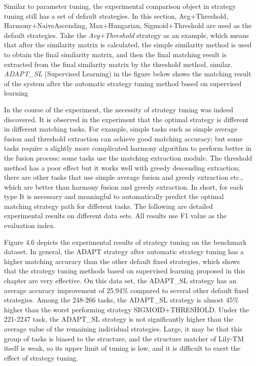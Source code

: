 \documentclass[twoside]{article}
\makeatletter
\def\subsubsection{\@startsection{subsubsection}{3}{\z@}%
 {-2.2ex\@plus -.21ex \@minus -.2ex}%
 {1.4ex \@plus.2ex}
{\normalfont\normalsize\protect\baselineskip=12pt plus.2pt minus.2pt\sl}}
\makeatother
\begin{document}

Similar to parameter tuning, the experimental comparison object in strategy tuning still has a set of default strategies. In this section, Avg+Threshold, Harmony+NaiveAscending, Max+Hungarian, Sigmoid+Threshold are used as the default strategies.
Take the {\it Avg+Threshold} strategy as an example, which means that after the similarity matrix is calculated, the simple similarity method is used to obtain the final similarity matrix, and then the final matching result is extracted from the final similarity matrix by the threshold method. similar.
{\it ADAPT\_SL} (Supervised Learning) in the figure below shows the matching result of the system after the automatic strategy tuning method based on supervised learning

In the course of the experiment, the necessity of strategy tuning was indeed discovered.
It is observed in the experiment that the optimal strategy is different in different matching tasks.
For example, simple tasks such as simple average fusion and threshold extraction can achieve good matching accuracy; but some tasks require a slightly more complicated harmony algorithm to perform better in the fusion process; some tasks use the matching extraction module. The threshold method has a poor effect but it works well with greedy descending extraction; there are other tasks that use simple average fusion and greedy extraction etc., which are better than harmony fusion and greedy extraction.
In short, for each type It is necessary and meaningful to automatically predict the optimal matching strategy path for different tasks.
The following are detailed experimental results on different data sets. All results use F1 value as the evaluation index.

Figure 4.6 depicts the experimental results of strategy tuning on the benchmark dataset.
In general, the ADAPT strategy after automatic strategy tuning has a higher matching accuracy than the other default fixed strategies, which shows that the strategy tuning methods based on supervised learning proposed in this chapter are very effective.
On this data set, the ADAPT\_SL strategy has an average accuracy improvement of 25.94\% compared to several other default fixed strategies.
Among the 248-266 tasks, the ADAPT\_SL strategy is almost 45\% higher than the worst performing strategy SIGMOID+THRESHOLD.
Under the 221-2247 task, the ADAPT\_SL strategy is not significantly higher than the average value of the remaining individual strategies. Large, it may be that this group of tasks is biased to the structure, and the structure matcher of Lily-TM itself is weak, so its upper limit of tuning is low, and it is difficult to exert the effect of strategy tuning.
\end{document}
